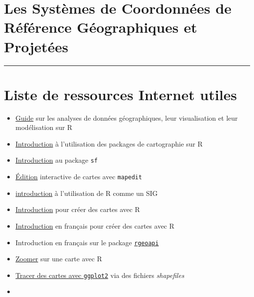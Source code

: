 \documentclass[
  french,
]{book}
\providecommand{\tightlist}{%
  \setlength{\itemsep}{0pt}\setlength{\parskip}{0pt}}
\begin{document}
\hypertarget{CRS}{%
\section{Les Systèmes de Coordonnées de Référence Géographiques et Projetées}\label{CRS}}

\begin{center}\rule{0.5\linewidth}{0.5pt}\end{center}

\hypertarget{ref-sig}{%
\section*{Liste de ressources Internet utiles}\label{ref-sig}}

\begin{itemize}
\tightlist
\item
  \href{https://geocompr.robinlovelace.net/}{Guide} sur les analyses de données
  géographiques, leur visualisation et leur modélisation sur R
\item
  \href{https://statnmap.com/2018-07-14-introduction-to-mapping-with-sf-and-co/}{Introduction}
  à l'utilisation des packages de cartographie sur R
\item
  \href{https://www.infoworld.com/article/3505897/how-to-do-spatial-analysis-in-r-with-sf.amp.html}{Introduction}
  au package \texttt{sf}
\item
  \href{https://github.com/r-spatial/mapedit}{Édition} interactive de cartes avec
  \texttt{mapedit}
\item
  \href{https://mhallwor.github.io/_pages/welcome}{introduction} à l'utilisation de R
  comme un SIG
\item
  \href{http://eriqande.github.io/rep-res-web/lectures/making-maps-with-R.html}{Introduction}
  pour créer des cartes avec R
\item
  \href{https://thinkr.fr/sil-te-plait-dessine-moi-carte-r/}{Introduction}
  en français pour créer des cartes avec R
\item
  Introduction en français sur le package
  \href{https://colinfay.me/carte-r-rgeoapi-ggplot2/}{\texttt{rgeoapi}}
\item
  \href{https://rgeomatic.hypotheses.org/tag/sf}{Zoomer} sur une carte avec R
\item
  \href{https://rpubs.com/huanfaChen/ggplotShapefile}{Tracer des cartes avec \texttt{ggplot2}}
  via des fichiers \emph{shapefiles}
\item

\end{itemize}
\end{document}
